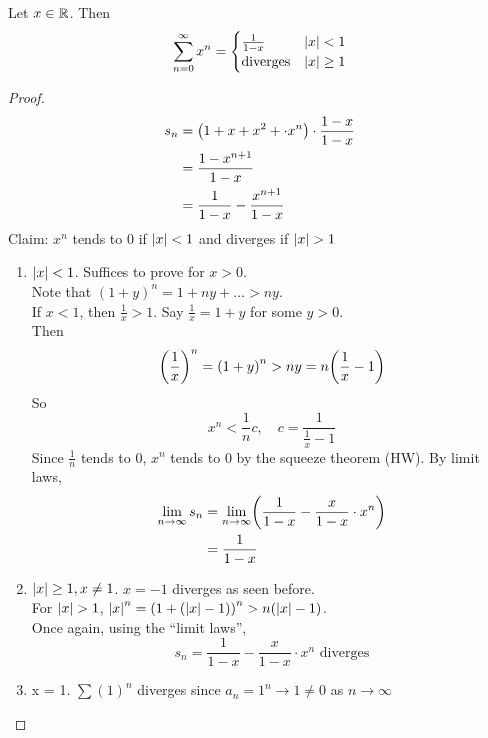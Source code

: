 \documentclass[12pt]{article}
\begin{document}
\begin{example}
    Let $x \in \mathbb{R}$. Then \[
        \sum_{n=0}^{\infty} x^{n} = \begin{cases}
            \frac{1}{1-x} & \abs{ x} < 1 \\
            \text{diverges} & \abs{ x} \geq 1
        \end{cases}
    \]
\end{example}
\begin{proof}
    \begin{align*}
        s_{n} &= \paren{1 + x + x^{2} + \cdot x^{n} } \cdot \frac{1-x}{1-x} \\
        &= \frac{1-x^{n+1}}{1-x} \\
        &= \frac{1}{1-x} - \frac{x^{n+1}}{1-x}
    \end{align*}
    Claim: $x^{n}$ tends to 0 if $\abs{ x} < 1$ and diverges if $\abs{ x}  > 1$
    \begin{enumerate}[label=(Case \arabic*)]
        \item $\abs{ x} < 1$. Suffices to prove for $x > 0$. \\
        Note that $(1 + y)^{n} = 1 + ny + \dots > ny$. \\
        If $x < 1$, then $\frac{1}{x} > 1$. Say $\frac{1}{x} = 1 + y$ for some $y > 0$. \\
        Then \[
            \paren{\frac{1}{x}}^{n} = \paren{1 + y}^{n} > ny = n\paren{\frac{1}{x} - 1}
        \] So \[
            x^{n} < \frac{1}{n} c, \quad c = \frac{1}{\frac{1}{x} - 1}
        \] Since $\frac{1}{n}$ tends to $0$, $x^{n}$ tends to $0$ by the squeeze theorem (HW). By limit laws,
        \begin{align*}
            \lim_{n \to \infty} s_{n} &= \lim_{n \to \infty} \paren{\frac{1}{1-x} - \frac{x}{1-x}\cdot x^{n}} \\
            &= \frac{1}{1-x}
        \end{align*}
        
        \item $\abs{ x} \geq 1, x \neq 1$. $x = -1$ diverges as seen before. \\
        For $\abs{ x} > 1$, $\abs{ x} ^{n} = \paren{1 + (\abs{ x} - 1)}^{n} > n(\abs{ x} - 1)$. \\
        Once again, using the ``limit laws'', \[
            s_{n} = \frac{1}{1-x} - \frac{x}{1-x} \cdot x^{n} \text{ diverges}
        \]

        \item x = 1. $\sum (1)^{n}$ diverges since $a_{n} = 1^{n} \to 1 \neq 0$ as $n \to \infty$ \qedhere
    \end{enumerate}
\end{proof}
\end{document}
